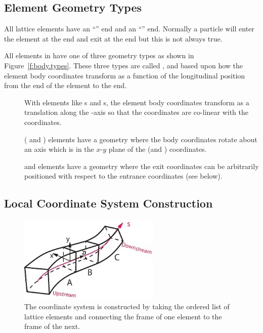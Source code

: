 \documentclass{hitec}
\begin{document}
\subsection{Element Geometry Types}

All lattice elements have an ``'' end and an ``'' end. Normally a particle
will enter the element at the  end and exit at the  end but this is not always
true.

All elements in \bmad have one of three geometry types as shown in Figure~\ref{f:body.types}.  These
three types are called ,  and  based upon how the element body
coordinates transform as a function of the longitudinal  position from the  end
of the element to the  end.
\begin{description}
\item[] \Newline
With  elements like s and s, the element body coordinates
transform as a translation along the  -axis so that the  coordinates are
co-linear with the  coordinates.
\item[] \Newline
( and ) elements have a  geometry where the body coordinates rotate
about an axis which is in the $x$-$y$ plane of the  (and ) coordinates.
\item[] \Newline 
{} and  elements have a  geometry where the exit coordinates can
be arbitrarily positioned with respect to the entrance coordinates (see below).
\end{description}

\subsection{Local Coordinate System Construction}

\begin{figure}[tb]
  \centering
  \includegraphics[width=0.6\textwidth]{element-stream.pdf}
  \caption{The  coordinate system is constructed by taking the ordered list of lattice elements and
connecting the  frame of one element to the  frame of the next.}
  \label{f:leggo}
\end{figure}
\end{document}
